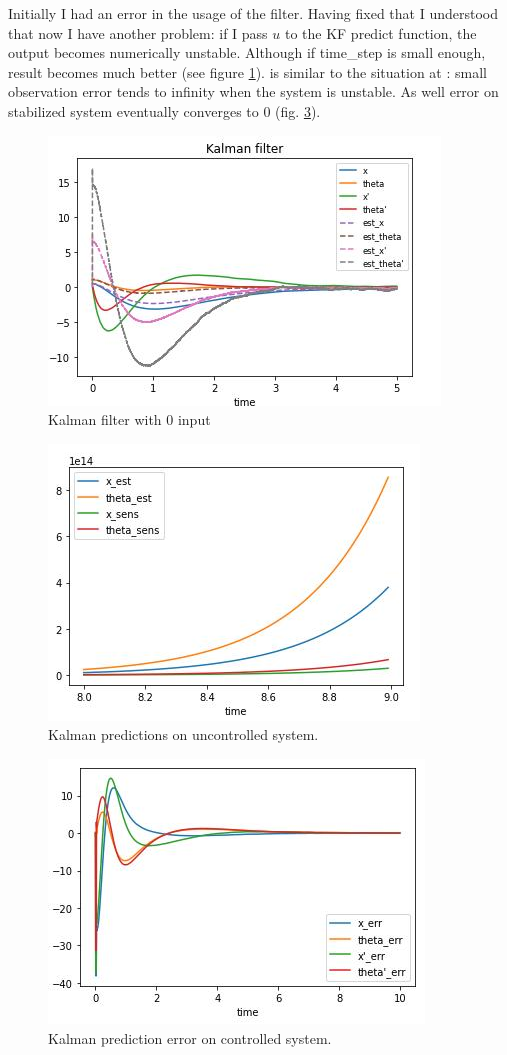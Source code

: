 \documentclass[12pt,letterpaper]{article}
\begin{document}
    Initially I had an error in the usage of the filter. Having fixed that I understood that now I have another problem: if I pass $u$ to the KF predict function, the output becomes numerically unstable. Although if time\_step is small enough, result becomes much better (see figure \ref{fig:output_noise_0005_filtered}).  is similar to the situation at : small observation error tends to infinity when the system is unstable. As well error on stabilized system eventually converges to 0 (fig. \ref{fig:kalman_prediction_error}).
    
    
    \begin{figure}[htb]
    \centering
        \includegraphics[width=0.5\linewidth]{images/filter/kalman.jpg}
    \caption{Kalman filter with 0 input}
    \label{fig:output_noise_0005_filtered}
    \end{figure}
    
    \begin{figure}[htb]
        \centering
        \includegraphics[width=0.5\linewidth]{images/filter/kalman_uncontrolled.jpg}
        \caption{Kalman predictions on uncontrolled system.}
        \label{fig:kalman_uncontrolled}
    \end{figure}
    
    \begin{figure}[htb]
        \centering
        \includegraphics[width=0.5\linewidth]{images/filter/kalman_prediction_error.jpg}
        \caption{Kalman prediction error on controlled system.}
        \label{fig:kalman_prediction_error}
    \end{figure}
    
\end{document}
